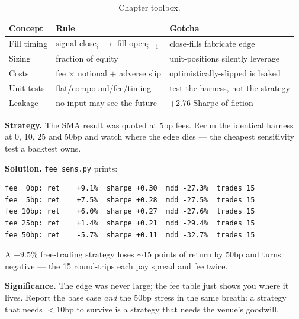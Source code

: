 \begin{table}[htbp]\centering\small
\caption{Chapter toolbox.}
\begin{tabular}{@{}lll@{}}
\toprule
Concept & Rule & Gotcha\\
\midrule
Fill timing & signal close$_i$ $\to$ fill open$_{i+1}$ & close-fills fabricate edge\\
Sizing & fraction of equity & unit-positions silently leverage\\
Costs & fee $\times$ notional $+$ adverse slip & optimistically-slipped is leaked\\
Unit tests & flat/compound/fee/timing & test the harness, not the strategy\\
Leakage & no input may see the future & +2.76 Sharpe of fiction\\
\bottomrule
\end{tabular}
\end{table}

\begin{example}\label{ex:feestress}
\textbf{Strategy.} The SMA result was quoted at 5bp fees. Rerun
the identical harness at 0, 10, 25 and 50bp and watch where the
edge dies --- the cheapest sensitivity test a backtest owns.

\textbf{Solution.} \texttt{fee\_sens.py} prints:
\begin{verbatim}
fee  0bp: ret    +9.1%  sharpe +0.30  mdd -27.3%  trades 15
fee  5bp: ret    +7.5%  sharpe +0.28  mdd -27.5%  trades 15
fee 10bp: ret    +6.0%  sharpe +0.27  mdd -27.6%  trades 15
fee 25bp: ret    +1.4%  sharpe +0.21  mdd -29.4%  trades 15
fee 50bp: ret    -5.7%  sharpe +0.11  mdd -32.7%  trades 15
\end{verbatim}
A $+9.5\%$ free-trading strategy loses $\sim$15 points of return
by 50bp and turns negative --- the 15 round-trips each pay spread
and fee twice.

\textbf{Significance.} The edge was never large; the fee table
just shows you where it lives. Report the base case \emph{and} the
50bp stress in the same breath: a strategy that needs $<$10bp to
survive is a strategy that needs the venue's goodwill.
\end{example}


